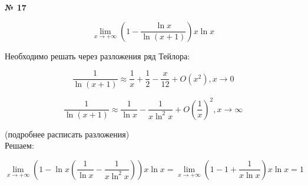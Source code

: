 \documentclass{article}
\begin{document}
\textbf{№ 17}

$$ \lim\limits_{x\to +\infty} \left( 1 - \frac{\ln{x}}{\ln{(x+1)}} \right) x\ln{x} $$

Необходимо решать через разложения ряд Тейлора:

$$ \frac{1}{\ln{(x+1)}} \approx \frac{1}{x} + \frac{1}{2} - \frac{x}{12} + O\left( x^2 \right), x \to 0 $$

$$ \frac{1}{\ln{(x+1)}} \approx \frac{1}{\ln{x}} - \frac{1}{x\ln^2{x}} + O\left( \frac{1}{x} \right)^2, x \to \infty $$

(подробнее расписать разложения) \\
Решаем:

$$ \lim\limits_{x\to +\infty} \left( 1 - \ln{x} \left( \frac{1}{\ln{x}} - \frac{1}{x\ln^2{x}} \right)  \right) x\ln{x} 
= \lim\limits_{x\to +\infty} \left( 1 - 1 + \frac{1}{x\ln{x}} \right) x\ln{x} 
= 1 $$
\end{document}
